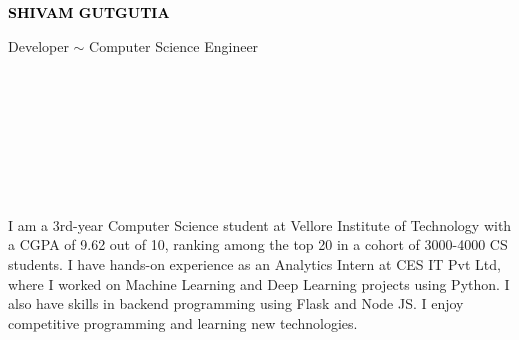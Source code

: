 \documentclass[9pt]{developercv}
\begin{document}

\begin{minipage}[t]{0.5\textwidth}
  \vspace{-\baselineskip}

  { \fontsize{16}{20} \textcolor{black}{\textbf{\MakeUppercase{Shivam Gutgutia}}}}

  \vspace{6pt}

  {\Large Developer $\sim$ Computer Science Engineer}
\end{minipage}
\hfill
\begin{minipage}[t]{0.2\textwidth}
  \vspace{-\baselineskip}
  \\
  \\
  \\

\end{minipage}
\begin{minipage}[t]{0.27\textwidth}
  \vspace{-\baselineskip}

  \\
  \\
  \\

\end{minipage}



\vspace{-6pt}

\hfill
I am a 3rd-year Computer Science student at Vellore Institute of Technology with a CGPA of 9.62 out of 10, ranking among the top 20 in a cohort of 3000-4000 CS students. I have hands-on experience as an Analytics Intern at CES IT Pvt Ltd, where I worked on Machine Learning and Deep Learning projects using Python. I also have skills in backend programming using Flask and Node JS. I enjoy competitive programming and learning new technologies.\\
\end{document}
